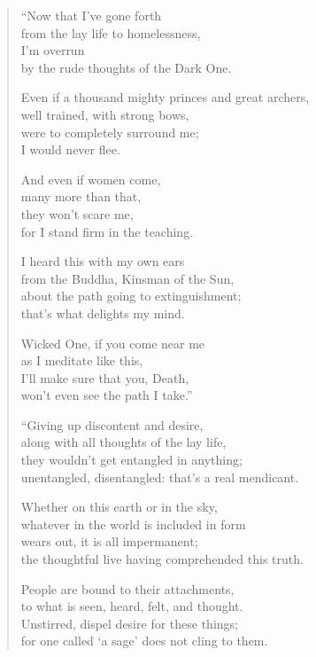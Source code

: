 \documentclass[12pt,openany]{book}%
\begin{document}
\begin{verse}%
“Now that I’ve gone forth \\
from the lay life to homelessness, \\
I’m overrun \\
by the rude thoughts of the Dark One. 

Even if a thousand mighty princes and great archers, \\
well trained, with strong bows, \\
were to completely surround me; \\
I would never flee. 

And even if women come, \\
many more than that, \\
they won’t scare me, \\
for I stand firm in the teaching. 

I heard this with my own ears \\
from the Buddha, Kinsman of the Sun, \\
about the path going to extinguishment; \\
that’s what delights my mind. 

Wicked One, if you come near me \\
as I meditate like this, \\
I’ll make sure that you, Death, \\
won’t even see the path I take.” 

“Giving up discontent and desire, \\
along with all thoughts of the lay life, \\
they wouldn’t get entangled in anything; \\
unentangled, disentangled: that’s a real mendicant. 

Whether on this earth or in the sky, \\
whatever in the world is included in form \\
wears out, it is all impermanent; \\
the thoughtful live having comprehended this truth. 

People are bound to their attachments, \\
to what is seen, heard, felt, and thought. \\
Unstirred, dispel desire for these things; \\
for one called ‘a sage’ does not cling to them. 


\end{verse}
\end{document}
